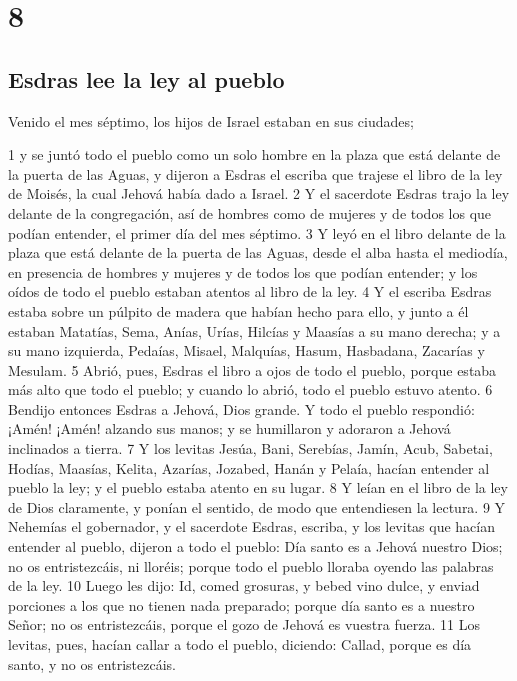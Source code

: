 \chapter{8}

\section*{Esdras lee la ley al pueblo}

Venido el mes séptimo, los hijos de Israel estaban en sus ciudades;

1 y se juntó todo el pueblo como un solo hombre en la plaza que está delante de la puerta de las Aguas, y dijeron a Esdras el escriba que trajese el libro de la ley de Moisés, la cual Jehová había dado a Israel.
2 Y el sacerdote Esdras trajo la ley delante de la congregación, así de hombres como de mujeres y de todos los que podían entender, el primer día del mes séptimo.
3 Y leyó en el libro delante de la plaza que está delante de la puerta de las Aguas, desde el alba hasta el mediodía, en presencia de hombres y mujeres y de todos los que podían entender; y los oídos de todo el pueblo estaban atentos al libro de la ley.
4 Y el escriba Esdras estaba sobre un púlpito de madera que habían hecho para ello, y junto a él estaban Matatías, Sema, Anías, Urías, Hilcías y Maasías a su mano derecha; y a su mano izquierda, Pedaías, Misael, Malquías, Hasum, Hasbadana, Zacarías y Mesulam.
5 Abrió, pues, Esdras el libro a ojos de todo el pueblo, porque estaba más alto que todo el pueblo; y cuando lo abrió, todo el pueblo estuvo atento.
6 Bendijo entonces Esdras a Jehová, Dios grande. Y todo el pueblo respondió: ¡Amén! ¡Amén! alzando sus manos; y se humillaron y adoraron a Jehová inclinados a tierra.
7 Y los levitas Jesúa, Bani, Serebías, Jamín, Acub, Sabetai, Hodías, Maasías, Kelita, Azarías, Jozabed, Hanán y Pelaía, hacían entender al pueblo la ley; y el pueblo estaba atento en su lugar.
8 Y leían en el libro de la ley de Dios claramente, y ponían el sentido, de modo que entendiesen la lectura.
9 Y Nehemías el gobernador, y el sacerdote Esdras, escriba, y los levitas que hacían entender al pueblo, dijeron a todo el pueblo: Día santo es a Jehová nuestro Dios; no os entristezcáis, ni lloréis; porque todo el pueblo lloraba oyendo las palabras de la ley.
10 Luego les dijo: Id, comed grosuras, y bebed vino dulce, y enviad porciones a los que no tienen nada preparado; porque día santo es a nuestro Señor; no os entristezcáis, porque el gozo de Jehová es vuestra fuerza.
11 Los levitas, pues, hacían callar a todo el pueblo, diciendo: Callad, porque es día santo, y no os entristezcáis.
